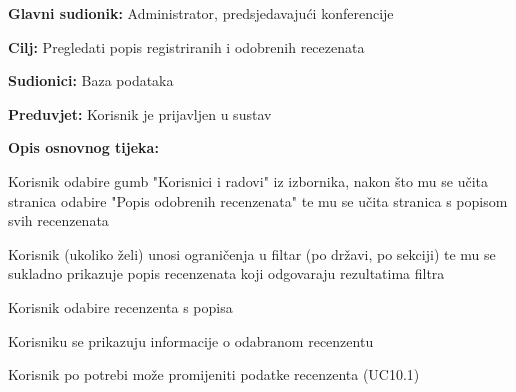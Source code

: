 					
					\noindent {}
					\begin{packed_item}
						
						\item \textbf{Glavni sudionik: } Administrator, predsjedavajući konferencije
						\item  \textbf{Cilj:} Pregledati popis registriranih i odobrenih recezenata
						\item  \textbf{Sudionici:} Baza podataka
						\item  \textbf{Preduvjet:} Korisnik je prijavljen u sustav
						\item  \textbf{Opis osnovnog tijeka:}
						
						\item[] \begin{packed_enum}
							
							\item Korisnik odabire gumb "Korisnici i radovi" iz izbornika, nakon što mu se učita stranica odabire "Popis odobrenih recenzenata" te mu se učita stranica s popisom svih recenzenata
							\item Korisnik (ukoliko želi) unosi ograničenja u filtar (po državi, po sekciji) te mu se sukladno prikazuje popis recenzenata koji odgovaraju rezultatima filtra
							\item Korisnik odabire recenzenta s popisa
							\item Korisniku se prikazuju informacije o odabranom recenzentu
							\item Korisnik po potrebi može promijeniti podatke recenzenta (UC10.1)
							
							
						\end{packed_enum}
						
					\end{packed_item}
					
